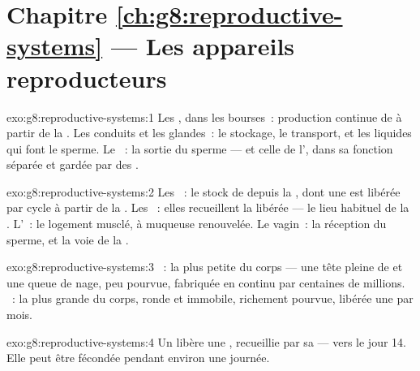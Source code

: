 \section*{Chapitre \ref{ch:g8:reproductive-systems} --- Les appareils reproducteurs}

\begin{solution}{exo:g8:reproductive-systems:1}
Les , dans les bourses~: production continue de  à partir de la . Les conduits et les glandes~: le
stockage, le transport, et les liquides qui font le sperme. Le
~: la sortie du sperme --- et celle de l', dans sa
fonction séparée et gardée par des .
\end{solution}

\begin{solution}{exo:g8:reproductive-systems:2}
Les ~: le stock de  depuis la , dont
une est libérée par cycle à partir de la . Les ~:
elles recueillent la  libérée --- le lieu habituel de la
. L'~: le logement musclé, à muqueuse renouvelée.
Le vagin~: la réception du sperme, et la voie de la .
\end{solution}

\begin{solution}{exo:g8:reproductive-systems:3}
~: la plus petite du corps --- une tête pleine de 
et une queue de nage, peu pourvue, fabriquée en continu par
centaines de millions. ~: la plus grande du corps, ronde
et immobile, richement pourvue, libérée une par mois.
\end{solution}

\begin{solution}{exo:g8:reproductive-systems:4}
Un  libère une , recueillie par sa  --- vers
le jour 14. Elle peut être fécondée pendant environ une journée.
\end{solution}


